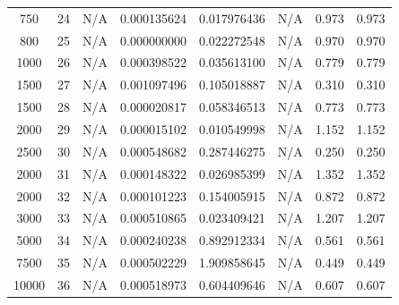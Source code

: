 \documentclass[letterpaper,10pt]{article}
\begin{document}
\begin{table}[H]
{\begin{tabular}{|c|c|c|c|c|c|c|c|}
      750  & 24  & N/A         & \cellcolor{sgreen}0.000135624 & \cellcolor{syellow}0.017976436 & N/A    & \cellcolor{sgreen}0.973  & \cellcolor{sgreen}0.973  \\ 
      800  & 25  & N/A         & \cellcolor{sgreen}0.000000000 & \cellcolor{syellow}0.022272548 & N/A    & \cellcolor{sgreen}0.970  & \cellcolor{sgreen}0.970  \\ 
      1000 & 26  & N/A         & \cellcolor{sgreen}0.000398522 & \cellcolor{syellow}0.035613100 & N/A    & \cellcolor{sgreen}0.779  & \cellcolor{sgreen}0.779  \\ 
      1500 & 27  & N/A         & \cellcolor{sgreen}0.001097496 & \cellcolor{syellow}0.105018887 & N/A    & \cellcolor{sgreen}0.310  & \cellcolor{sgreen}0.310  \\ 
      1500 & 28  & N/A         & \cellcolor{sgreen}0.000020817 & \cellcolor{syellow}0.058346513 & N/A    & \cellcolor{sgreen}0.773  & \cellcolor{sgreen}0.773  \\ 
      2000 & 29  & N/A         & \cellcolor{sgreen}0.000015102 & \cellcolor{syellow}0.010549998 & N/A    & \cellcolor{sgreen}1.152  & \cellcolor{sgreen}1.152  \\ 
      2500 & 30  & N/A         & \cellcolor{sgreen}0.000548682 & \cellcolor{syellow}0.287446275 & N/A    & \cellcolor{sgreen}0.250  & \cellcolor{sgreen}0.250  \\ 
      2000 & 31  & N/A         & \cellcolor{sgreen}0.000148322 & \cellcolor{syellow}0.026985399 & N/A    & \cellcolor{sgreen}1.352  & \cellcolor{sgreen}1.352  \\ 
      2000 & 32  & N/A         & \cellcolor{sgreen}0.000101223 & \cellcolor{syellow}0.154005915 & N/A    & \cellcolor{sgreen}0.872  & \cellcolor{sgreen}0.872  \\ 
      3000 & 33  & N/A         & \cellcolor{sgreen}0.000510865 & \cellcolor{syellow}0.023409421 & N/A    & \cellcolor{sgreen}1.207  & \cellcolor{sgreen}1.207  \\ 
      5000 & 34  & N/A         & \cellcolor{sgreen}0.000240238 & \cellcolor{syellow}0.892912334 & N/A    & \cellcolor{sgreen}0.561  & \cellcolor{sgreen}0.561  \\ 
      7500 & 35  & N/A         & \cellcolor{sgreen}0.000502229 & \cellcolor{syellow}1.909858645 & N/A    & \cellcolor{sgreen}0.449  & \cellcolor{sgreen}0.449  \\ 
      10000 & 36 & N/A         & \cellcolor{sgreen}0.000518973 & \cellcolor{syellow}0.604409646 & N/A    & \cellcolor{sgreen}0.607  & \cellcolor{sgreen}0.607  \\ 

\end{tabular}}
\end{table}
\end{document}
